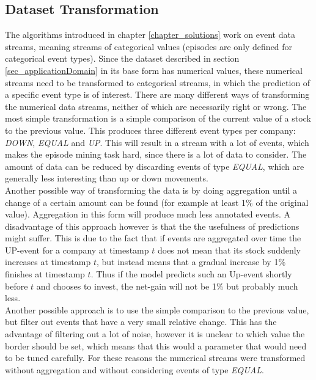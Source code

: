 \subsection{Dataset Transformation}
\label{subsec_transformation}
The algorithms introduced in chapter \ref{chapter_solutions} work on event data streams, meaning streams of categorical values (episodes are only defined for categorical event types). Since the dataset described in section \ref{sec_applicationDomain} in its base form has numerical values, these numerical streams need to be transformed to categorical streams, in which the prediction of a specific event type is of interest. There are many different ways of transforming the numerical data streams, neither of which are necessarily right or wrong. The most simple transformation is a simple comparison of the current value of a stock to the previous value. This produces three different event types per company: \textit{DOWN}, \textit{EQUAL} and \textit{UP}. This will result in a stream with a lot of events, which makes the episode mining task hard, since there is a lot of data to consider. The amount of data can be reduced by discarding events of type \textit{EQUAL}, which are generally less interesting than up or down movements. \\
Another possible way of transforming the data is by doing aggregation until a change of a certain amount can be found (for example at least 1\% of the original value). Aggregation in this form will produce much less annotated events. A disadvantage of this approach however is that the the usefulness of predictions might suffer. This is due to the fact that if events are aggregated over time the UP-event for a company at timestamp $t$ does not mean that its stock suddenly increases at timestamp $t$, but instead means that a gradual increase by 1\% finishes at timestamp $t$. Thus if the model predicts such an Up-event shortly before $t$ and chooses to invest, the net-gain will not be 1\% but probably much less. \\
Another possible approach is to use the simple comparison to the previous value, but filter out events that have a very small relative change. This has the advantage of filtering out a lot of noise, however it is unclear to which value the border should be set, which means that this would a parameter that would need to be tuned carefully. For these reasons the numerical streams were transformed without aggregation and without considering events of type \textit{EQUAL}.

